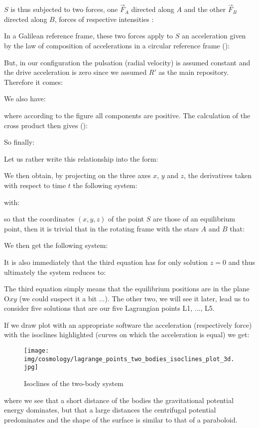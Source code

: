 	$S$ is thus subjected to two forces, one $\vec{F}_A$ directed along $A$ and the other $\vec{F}_B$ directed along $B$, forces of respective intensities :
	
	In a Galilean reference frame, these two forces apply to $S$ an acceleration given by the law of composition of accelerations in a circular reference frame ():
	
	But, in our configuration the pulsation (radial velocity) is assumed constant and the drive acceleration is zero since we assumed $R'$ as the main repository. Therefore it comes:
	
	We also have:
	
	where according to the figure all components are positive. The calculation of the cross product then gives ():
	
	So finally:
	
	Let us rather write this relationship into the form:
	
	We then obtain, by projecting on the three axes $x$, $y$ and $z$, the derivatives taken with respect to time $t$ the following system:
	
	with:
	
	so that the coordinates $(x,y,z)$ of the point $S$ are those of an equilibrium point, then it is trivial that in the rotating frame with the stars $A$ and $B$ that:
	
	We then get the following system:
	
	It is also immediately that the third equation has for only solution $z=0$ and thus ultimately the system reduces to:
	
	The third equation simply means that the equilibrium positions are in the plane O$xy$ (we could suspect it a bit ...). The other two, we will see it later, lead us to consider five solutions that are our five Lagrangian points L1, ..., L5.

	If we draw plot with an appropriate software the acceleration (respectively force) with the isoclines highlighted (curves on which the acceleration is equal) we get:
	\begin{figure}[H]
		\begin{center}
		\texttt{[image: img/cosmology/lagrange\_points\_two\_bodies\_isoclines\_plot\_3d.jpg]}
		\end{center}	
		\caption{Isoclines of the two-body system}
	\end{figure}
	where we see that a short distance of the bodies the gravitational potential energy dominates, but that a large distances the centrifugal potential predominates and the shape of the surface is similar to that of a paraboloid.

